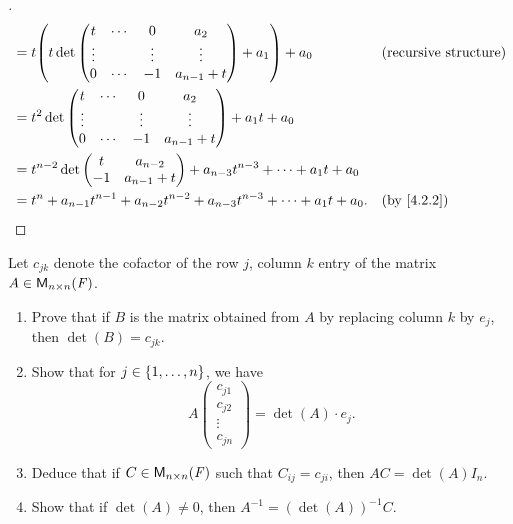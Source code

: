 \begin{proof}[]
\begin{align*}
     & = t \pa{t \det\begin{pmatrix}
                         t      & \cdots & 0      & a_2           \\
                         \vdots &        & \vdots & \vdots        \\
                         0      & \cdots & -1     & a_{n - 1} + t
                       \end{pmatrix} + a_1} + a_0                                                     &  & \text{(recursive structure)} \\
     & = t^2 \det\begin{pmatrix}
                   t      & \cdots & 0      & a_2           \\
                   \vdots &        & \vdots & \vdots        \\
                   0      & \cdots & -1     & a_{n - 1} + t
                 \end{pmatrix} + a_1 t + a_0                                                                             \\
     & = t^{n - 2} \det\begin{pmatrix}
                         t  & a_{n - 2}     \\
                         -1 & a_{n - 1} + t
                       \end{pmatrix} + a_{n - 3} t^{n - 3} + \cdots + a_1 t + a_0                                                     \\
     & = t^n + a_{n - 1} t^{n - 1} + a_{n - 2} t^{n - 2} + a_{n - 3} t^{n - 3} + \cdots + a_1 t + a_0. &  & \by{4.2.2}
  \end{align*}
\end{proof}

\begin{ex}\label{ex:4.3.25}
  Let \(c_{j k}\) denote the cofactor of the row \(j\), column \(k\) entry of the matrix \(A \in \ms[n][n][\F]\).
  \begin{enumerate}
    \item Prove that if \(B\) is the matrix obtained from \(A\) by replacing column \(k\) by \(e_j\), then \(\det(B) = c_{j k}\).
    \item Show that for \(j \in \left\lbrace1, \dots, n\right\rbrace\), we have
          \[
            A \begin{pmatrix}
              c_{j 1} \\
              c_{j 2} \\
              \vdots  \\
              c_{j n}
            \end{pmatrix} = \det(A) \cdot e_j.
          \]
    \item Deduce that if \(C \in \ms[n][n][\F]\) such that \(C_{i j} = c_{j i}\), then \(AC = \det(A) I_n\).
    \item Show that if \(\det(A) \neq 0\), then \(A^{-1} = (\det(A))^{-1} C\).
  \end{enumerate}
\end{ex}

